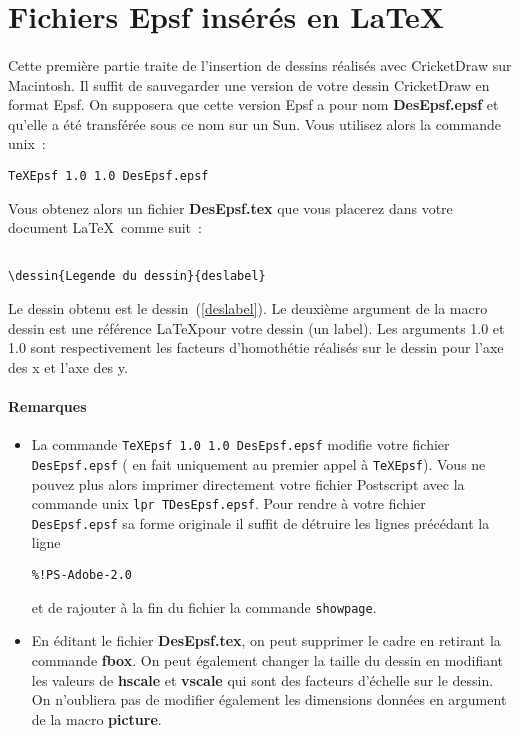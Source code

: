 
\section{Fichiers Epsf  ins\'er\'es en \LaTeX} 

\paragraph{}Cette premi\`ere partie traite de l'insertion de dessins r\'ealis\'es avec CricketDraw sur Macintosh. Il suffit de sauvegarder une version de 
votre dessin CricketDraw en format Epsf. 
On supposera que cette version Epsf a pour nom {\bf DesEpsf.epsf} et qu'elle a \'et\'e transf\'er\'ee sous ce nom sur un Sun. 
Vous utilisez alors la commande unix~:
\begin{verbatim}
TeXEpsf 1.0 1.0 DesEpsf.epsf
\end{verbatim}
Vous obtenez alors un fichier {\bf DesEpsf.tex} que vous placerez dans votre 
document \LaTeX\, comme suit~:

\begin{verbatim}

\dessin{Legende du dessin}{deslabel}
\end{verbatim}
Le dessin obtenu est le dessin~(\ref{deslabel}). Le deuxi\`eme argument 
 de la macro dessin est une r\'ef\'erence \LaTeX pour votre dessin (un label). Les arguments 1.0 et 1.0 sont respectivement les facteurs d'homoth\'etie r\'ealis\'es sur le dessin pour l'axe des x et l'axe des y.

\paragraph{Remarques}
\begin{itemize}
\item La commande \verb+TeXEpsf 1.0 1.0 DesEpsf.epsf+ modifie votre fichier \verb+DesEpsf.epsf+ ( en fait uniquement au premier appel \`a \verb+TeXEpsf+). Vous ne pouvez plus alors imprimer directement votre fichier Postscript avec  la commande unix \verb+lpr TDesEpsf.epsf+. Pour rendre \`a votre fichier
 \verb+DesEpsf.epsf+ sa forme originale il suffit de d\'etruire les lignes pr\'ec\'edant la ligne 
\begin{verbatim} 
%!PS-Adobe-2.0 
\end{verbatim}
et de rajouter \`a la fin du fichier la commande \verb+showpage+.
\item En \'editant le fichier {\bf DesEpsf.tex}, on peut supprimer le cadre  en retirant la commande {\bf fbox}. On peut \'egalement changer la taille du dessin en modifiant les valeurs de {\bf hscale} et {\bf vscale} qui sont des facteurs d'\'echelle sur le dessin. On n'oubliera pas de modifier 
 \'egalement les dimensions donn\'ees en argument de la macro {\bf picture}.
\end{itemize}


